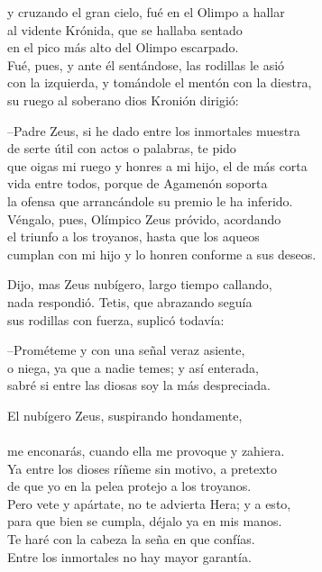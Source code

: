 y cruzando el gran cielo, fué en el Olimpo a hallar\\
al vidente Krónida, que se hallaba sentado\\
en el pico más alto del Olimpo escarpado.\\
Fué, pues, y ante él sentándose, las rodillas le asió\\
con la izquierda, y tomándole el mentón con la diestra,\\
su ruego al soberano dios Kronión dirigió:\par
--Padre Zeus, si he dado entre los inmortales muestra\\
de serte útil con actos o palabras, te pido\\
que oigas mi ruego y honres a mi hijo, el de más corta\\
vida entre todos, porque de Agamenón soporta\\
la ofensa que arrancándole su premio le ha inferido.\\
Véngalo, pues, Olímpico Zeus próvido, acordando\\
el triunfo a los troyanos, hasta que los aqueos\\
cumplan con mi hijo y lo honren conforme a sus deseos.\par
Dijo, mas Zeus nubígero, largo tiempo callando,\\
nada respondió. Tetis, que abrazando seguía\\
sus rodillas con fuerza, suplicó todavía:\par
--Prométeme y con una señal veraz asiente,\\
o niega, ya que a nadie temes; y así enterada,\\
sabré si entre las diosas soy la más despreciada.\par
El nubígero Zeus, suspirando hondamente,\\
\\
me enconarás, cuando ella me provoque y zahiera.\\
Ya entre los dioses ríñeme sin motivo, a pretexto\\
de que yo en la pelea protejo a los troyanos.\\
Pero vete y apártate, no te advierta Hera; y a esto,\\
para que bien se cumpla, déjalo ya en mis manos.\\
Te haré con la cabeza la seña en que confías.\\
Entre los inmortales no hay mayor garantía.\\
